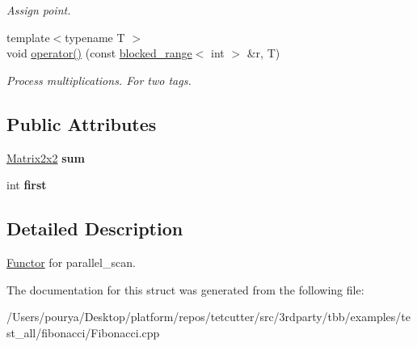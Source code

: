 \begin{DoxyCompactItemize}
\begin{DoxyCompactList}\small\item\em Assign point. \end{DoxyCompactList}\item 
\hypertarget{structparallel__scanFibBody_a1c518ddcb87f054b8fc3477211e7688c}{}{\footnotesize template$<$typename T $>$ }\\void \hyperlink{structparallel__scanFibBody_a1c518ddcb87f054b8fc3477211e7688c}{operator()} (const \hyperlink{classtbb_1_1blocked__range}{blocked\+\_\+range}$<$ int $>$ \&r, T)\label{structparallel__scanFibBody_a1c518ddcb87f054b8fc3477211e7688c}

\begin{DoxyCompactList}\small\item\em Process multiplications. For two tags. \end{DoxyCompactList}\end{DoxyCompactItemize}
\subsection*{Public Attributes}
\begin{DoxyCompactItemize}
\item 
\hypertarget{structparallel__scanFibBody_a1996c6e964292dc4e59c5ba6927b3674}{}\hyperlink{structMatrix2x2}{Matrix2x2} {\bfseries sum}\label{structparallel__scanFibBody_a1996c6e964292dc4e59c5ba6927b3674}

\item 
\hypertarget{structparallel__scanFibBody_a5759feecb705237e0e8b41e582592a04}{}int {\bfseries first}\label{structparallel__scanFibBody_a5759feecb705237e0e8b41e582592a04}

\end{DoxyCompactItemize}


\subsection{Detailed Description}
\hyperlink{structFunctor}{Functor} for parallel\+\_\+scan. 

The documentation for this struct was generated from the following file\+:\begin{DoxyCompactItemize}
\item 
/\+Users/pourya/\+Desktop/platform/repos/tetcutter/src/3rdparty/tbb/examples/test\+\_\+all/fibonacci/Fibonacci.\+cpp\end{DoxyCompactItemize}

